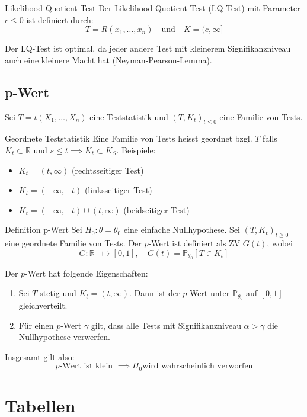 \documentclass[a4paper,10pt]{article}
\def\R{\mathbb{R}}
\def\P{\mathbb{P}}
\begin{document}
\begin{subbox}{Likelihood-Quotient-Test}
    Der Likelihood-Quotient-Test (LQ-Test) mit Parameter \(c \le 0\) ist definiert durch:
    \[T = R(x_1, \ldots, x_n) \quad \text{und} \quad K = (c, \infty]\]
\end{subbox}
Der LQ-Test ist optimal, da jeder andere Test mit kleinerem Signifikanzniveau auch eine kleinere Macht hat (Neyman-Pearson-Lemma).

\subsection{p-Wert}
Sei \(T = t(X_1, \ldots, X_n)\) eine Teststatistik und \((T,K_t)_{t\le 0}\) eine Familie von Tests.

\begin{subbox}{Geordnete Teststatistik}
    Eine Familie von Tests heisst geordnet bzgl. \(T\) falls \(K_t \subset \R\) und \(s \le t \implies K_t \subset K_S\). Beispiele:
    \begin{itemize}
        \item \(K_t = (t, \infty)\) (rechtsseitiger Test)
        \item \(K_t = (-\infty, -t)\) (linksseitiger Test)
        \item \(K_t = (-\infty, -t) \cup (t, \infty)\) (beidseitiger Test)
    \end{itemize}
\end{subbox}

\begin{mainbox}{Definition p-Wert}
    Sei \(H_0: \theta = \theta_0\) eine einfache Nullhypothese. Sei \((T, K_t)_{t\ge 0}\) eine geordnete Familie von Tests. Der \(p\)-Wert ist definiert als ZV \(G(t)\), wobei
    \[G: \R_+ \mapsto [0,1], \quad G(t) = \P_{\theta_0}[T \in K_t]\]
\end{mainbox}
Der \(p\)-Wert hat folgende Eigenschaften:
\begin{enumerate}
    \item Sei \(T\) stetig und \(K_t = (t, \infty)\). Dann ist der \(p\)-Wert unter \(\P_{\theta_0}\) auf \([0,1]\) gleichverteilt.
    \item Für einen \(p\)-Wert \(\gamma\) gilt, dass alle Tests mit Signifikanzniveau \(\alpha > \gamma\) die Nullhypothese verwerfen.
\end{enumerate}

Insgesamt gilt also:
\[p\text{-Wert ist klein } \implies H_0 \text{wird wahrscheinlich verworfen} \]

\section{Tabellen}
\end{document}
